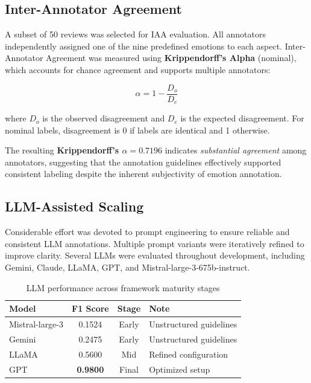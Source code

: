 \documentclass[10pt]{article}
\newenvironment{keybox}[1]{%
  \begin{tcolorbox}[
    enhanced,
    title=#1,
    colback=lightgray,
    colframe=accent,
    fonttitle=\bfseries\small\color{white},
    coltitle=white,
    attach boxed title to top left={yshift=-2mm, xshift=4mm},
    boxed title style={colback=accent, rounded corners},
    arc=3pt,
    left=6pt, right=6pt, top=10pt, bottom=6pt
  ]
}{%
  \end{tcolorbox}
}
\begin{document}
\subsection{Inter-Annotator Agreement}

A subset of 50 reviews was selected for IAA evaluation. All annotators independently assigned one of the nine predefined emotions to each aspect. Inter-Annotator Agreement was measured using \textbf{Krippendorff's Alpha} (nominal), which accounts for chance agreement and supports multiple annotators:

\begin{equation}
\alpha = 1 - \frac{D_o}{D_e}
\end{equation}

\noindent where $D_o$ is the observed disagreement and $D_e$ is the expected disagreement. For nominal labels, disagreement is 0 if labels are identical and 1 otherwise.

\begin{keybox}{IAA Result}
The resulting \textbf{Krippendorff's $\alpha = 0.7196$} indicates \emph{substantial agreement} among annotators, suggesting that the annotation guidelines effectively supported consistent labeling despite the inherent subjectivity of emotion annotation.
\end{keybox}

\subsection{LLM-Assisted Scaling}

Considerable effort was devoted to prompt engineering to ensure reliable and consistent LLM annotations. Multiple prompt variants were iteratively refined to improve clarity. Several LLMs were evaluated throughout development, including Gemini, Claude, LLaMA, GPT, and Mistral-large-3-675b-instruct.

\begin{table}[H]
\centering
\caption{LLM performance across framework maturity stages}
\small
{}
\begin{tabular}{lccl}
\toprule
\rowcolor{primary!90!black}
\color{white}\textbf{Model} & \color{white}\textbf{F1 Score} & \color{white}\textbf{Stage} & \color{white}\textbf{Note} \\
\midrule
Mistral-large-3 & 0.1524 & Early & Unstructured guidelines \\
Gemini & 0.2475 & Early & Unstructured guidelines \\
LLaMA & 0.5600 & Mid & Refined configuration \\
GPT & \textbf{0.9800} & Final & Optimized setup \\
\bottomrule
\end{tabular}
\end{table}
\end{document}
